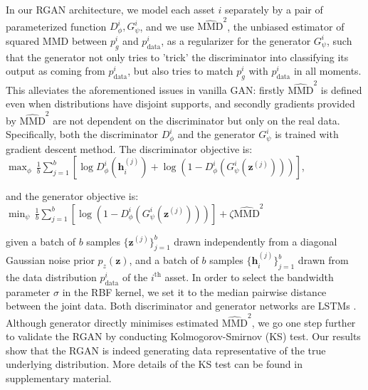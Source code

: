 \documentclass{article}
\begin{document}
In our RGAN architecture, we model each asset $i$ separately by a pair of parameterized function $D^i_\phi, G^i_\psi$, and we use $\widehat{\text{MMD}}^2$, the unbiased estimator of squared MMD between $p^i_g$ and $p^i_{\text{data}}$, as a regularizer for the generator $G^i_\psi$, such that the generator not only tries to 'trick' the discriminator into classifying its output as coming from $p^i_{\text{data}}$, but also tries to match $p^i_g$ with $p^i_{\text{data}}$ in all moments. This alleviates the aforementioned issues in vanilla GAN: firstly $\widehat{\text{MMD}}^2$ is defined even when distributions have disjoint supports, and secondly gradients provided by $\widehat{\text{MMD}}^2$ are not dependent on the discriminator but only on the real data. Specifically, both the discriminator $D^i_\phi$ and the generator $G^i_\psi$ is trained with gradient descent method. The discriminator objective is: \\
$ \max_\phi\,\frac{1}{b} \sum_{j=1}^b \left[ \log D^i_\phi(\mathbf{h}_i^{(j)}) + \log\left(1-D^i_\phi ( G^i_\psi (\mathbf{z}^{(j)}) )\right) \right]$, 

and the generator objective is: \\ 
$ \min_\psi\,\frac{1}{b} \sum_{j=1}^b \left[ \log \left( 1 - D^i_\phi ( G^i_\psi (\mathbf{z}^{(j)}) )  \right)\right] + \zeta\widehat{\text{MMD}}^2$

given a batch of $b$ samples $\{\mathbf{z}^{(j)}\}^b_{j=1}$ drawn independently from a diagonal Gaussian noise prior $p_z(\mathbf{z})$, and a batch of $b$ samples $\{\mathbf{h}_i^{(j)}\}^b_{j=1}$ drawn from the data distribution $p_{\text{data}}^i$ of the $i^{\text{th}}$ asset. \newline
In order to select the bandwidth parameter $\sigma$ in the RBF kernel, we set it to the median pairwise distance between the joint data. Both discriminator and generator networks are LSTMs \cite{hochreiter1997long}. \\
Although generator directly minimises estimated $\widehat{\text{MMD}}^2$, we go one step further to validate the RGAN by conducting Kolmogorov-Smirnov (KS) test. Our results show that the RGAN is indeed generating data representative of the true underlying distribution. More details of the KS test can be found in supplementary material.
\end{document}
